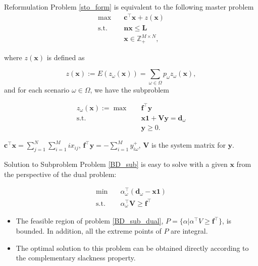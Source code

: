 \begin{frame}{Reformulation}
  \small
  Problem \eqref{sto_form} is equivalent to the following master problem
  \begin{equation}\label{BD_master}
    \begin{aligned}
  \max \quad & \mathbf{c}^{\intercal} \mathbf{x}+ z(\mathbf{x}) \\
  \text {s.t.} \quad & \mathbf{n} \mathbf{x} \leq \mathbf{L} \\
  & \mathbf{x} \in \mathbb{Z}_{+}^{M \times N},
  \end{aligned}
  \end{equation}

  where $z(\mathbf{x})$ is defined as 

$$z(\mathbf{x}) := E(z_{\omega}(\mathbf{x})) = \sum_{\omega \in \Omega} p_{\omega} z_{\omega}(\mathbf{x}),$$ and for each scenario $\omega \in \Omega$, we have the subproblem

  \begin{equation}\label{BD_sub}
    \begin{aligned}
      z_{\omega}(\mathbf{x}) := \max \quad & \mathbf{f}^{\intercal} \mathbf{y} \\
      \text {s.t.} \quad & \mathbf{x} \mathbf{1} + \mathbf{V} \mathbf{y} = \mathbf{d}_{\omega} \\
       & \mathbf{y} \geq 0.
    \end{aligned}
    \end{equation}

    \begin{tiny}
    $\mathbf{c}^{\intercal} \mathbf{x} =\sum_{j=1}^{N} \sum_{i=1}^{M} i x_{ij}$, $\mathbf{f}^{\intercal} \mathbf{y} = - \sum_{i=1}^{M} y_{i \omega}^{+}$, $\mathbf{V}$ is the system matrix for $\mathbf{y}$.
    \end{tiny}
\end{frame}

\begin{frame}{Solution to Subproblem}
  Problem \eqref{BD_sub} is easy to solve with a given $\mathbf{x}$ from the perspective of the dual problem:

  \begin{equation}\label{BD_sub_dual}
    \begin{aligned}
      \min \quad & \alpha^{\intercal}_{\omega} (\mathbf{d}_{\omega}- \mathbf{x} \mathbf{1}) \\
      \text {s.t.} \quad & \alpha^{\intercal}_{\omega} \mathbf{V} \geq \mathbf{f}^{\intercal}
    \end{aligned}
    \end{equation}

    \begin{itemize}
      \item The feasible region of problem \eqref{BD_sub_dual}, $P= \{\alpha|\alpha^{\intercal} V \geq \mathbf{f}^{\intercal}\}$, is bounded. In addition, all the extreme points of $P$ are integral.
      \item The optimal solution to this problem can be obtained directly according to the complementary slackness property.
    \end{itemize}
\end{frame}

